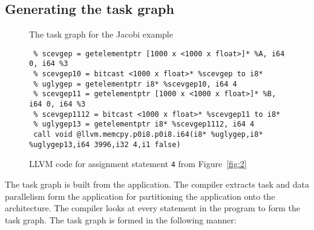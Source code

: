 \subsection{Generating the task graph}
\label{sec:build-appl-graph}

\begin{figure*}[t!]
  \scalebox{0.42}{}
  \caption{The task graph for the Jacobi example}
  \label{fig:1}
\end{figure*}

\begin{figure*}[t!]
  \centering
\begin{verbatim}
 % scevgep = getelementptr [1000 x <1000 x float>]* %A, i64 0, i64 %3
 % scevgep10 = bitcast <1000 x float>* %scevgep to i8*
 % uglygep = getelementptr i8* %scevgep10, i64 4
 % scevgep11 = getelementptr [1000 x <1000 x float>]* %B, i64 0, i64 %3
 % scevgep1112 = bitcast <1000 x float>* %scevgep11 to i8*
 % uglygep13 = getelementptr i8* %scevgep1112, i64 4
 call void @llvm.memcpy.p0i8.p0i8.i64(i8* %uglygep,i8* %uglygep13,i64 3996,i32 4,i1 false)
\end{verbatim}
  \caption{LLVM code for assignment statement \texttt{4} from
    Figure~\ref{fig:2}}
  \label{fig:3}
\end{figure*}

The task graph is built from the application. The compiler extracts task
and data parallelism form the application for partitioning the
application onto the architecture. The compiler looks at every statement
in the program to form the task graph. The task graph is formed in the
following manner:

